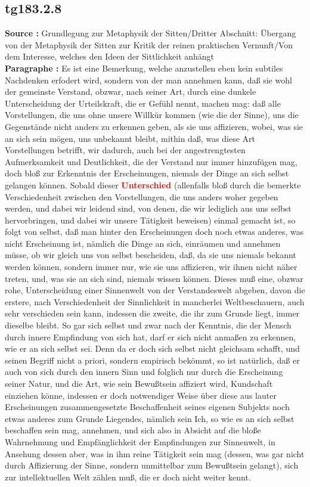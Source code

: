 \documentclass[a4paper,12pt,twoside]{book}
\newcommand{\match}[1]{\textcolor{red}{\textbf{#1}}}
\begin{document}
	\subsection*{tg183.2.8} 
	\textbf{Source : }Grundlegung zur Metaphysik der Sitten/Dritter Abschnitt: Übergang von der Metaphysik der Sitten zur Kritik der reinen praktischen Vernunft/Von dem Interesse, welches den Ideen der Sittlichkeit anhängt\\  
	
	\noindent\textbf{Paragraphe : }Es ist eine Bemerkung, welche anzustellen eben kein subtiles Nachdenken erfodert wird, sondern von der man annehmen kann, daß sie wohl der gemeinste Verstand, obzwar, nach seiner Art, durch eine dunkele Unterscheidung der Urteilskraft, die er Gefühl nennt, machen mag: daß alle Vorstellungen, die uns ohne unsere Willkür kommen (wie die der Sinne), uns die Gegenstände nicht anders zu erkennen geben, als sie uns affizieren, wobei, was sie an sich sein mögen, uns unbekannt bleibt, mithin daß, was diese Art Vorstellungen betrifft, wir dadurch, auch bei der angestrengtesten Aufmerksamkeit und Deutlichkeit, die der Verstand nur immer hinzufügen mag, doch bloß zur Erkenntnis der Erscheinungen, niemals der Dinge an sich selbst gelangen können. Sobald dieser \match{Unterschied} (allenfalls bloß durch die bemerkte Verschiedenheit zwischen den Vorstellungen, die uns anders woher gegeben werden, und dabei wir leidend sind, von denen, die wir lediglich aus uns selbst hervorbringen, und dabei wir unsere Tätigkeit beweisen) einmal gemacht ist, so folgt von selbst, daß man hinter den Erscheinungen doch noch etwas anderes, was nicht Erscheinung  ist, nämlich die Dinge an sich, einräumen und annehmen müsse, ob wir gleich uns von selbst bescheiden, daß, da sie uns niemals bekannt werden können, sondern immer nur, wie sie uns affizieren, wir ihnen nicht näher treten, und, was sie an sich sind, niemals wissen können. Dieses muß eine, obzwar rohe, Unterscheidung einer Sinnenwelt von der Verstandeswelt abgeben, davon die erstere, nach Verschiedenheit der Sinnlichkeit in mancherlei Weltbeschauern, auch sehr verschieden sein kann, indessen die zweite, die ihr zum Grunde liegt, immer dieselbe bleibt. So gar sich selbst und zwar nach der Kenntnis, die der Mensch durch innere Empfindung von sich hat, darf er sich nicht anmaßen zu erkennen, wie er an sich selbst sei. Denn da er doch sich selbst nicht gleichsam schafft, und seinen Begriff nicht a priori, sondern empirisch bekömmt, so ist natürlich, daß er auch von sich durch den innern Sinn und folglich nur durch die Erscheinung seiner Natur, und die Art, wie sein Bewußtsein affiziert wird, Kundschaft einziehen könne, indessen er doch notwendiger Weise über diese aus lauter Erscheinungen zusammengesetzte Beschaffenheit seines eigenen Subjekts noch etwas anderes zum Grunde Liegendes, nämlich sein Ich, so wie es an sich selbst beschaffen sein mag, annehmen, und sich also in Absicht auf die bloße Wahrnehmung und Empfänglichkeit der Empfindungen zur Sinnenwelt, in Ansehung dessen aber, was in ihm reine Tätigkeit sein mag (dessen, was gar nicht durch Affizierung der Sinne, sondern unmittelbar zum Bewußtsein gelangt), sich zur intellektuellen Welt zählen muß, die er doch nicht weiter kennt. 
	
\end{document}
